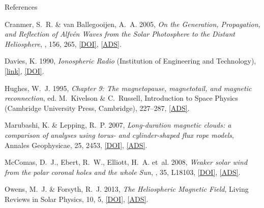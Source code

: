 \documentclass[11pt,aspectratio=1610]{beamer}	%
\begin{document}
\begin{frame}[t,allowframebreaks]{References}
	\tiny
	\begin{thebibliography}{10}
	
		\beamertemplatebookbibitems
		
		\beamertemplatearticlebibitems
		
			{Cranmer}, S.~R. \& {van Ballegooijen}, A.~A. 2005, \emph{{On the Generation,
			Propagation, and Reflection of Alfv{\'e}n Waves from the Solar Photosphere to
			the Distant Heliosphere}}, \apjs, 156, 265,
			\href{http://dx.doi.org/10.1086/426507}{[DOI]},
			\href{http://adsabs.harvard.edu/abs/2005ApJS..156..265C}{[ADS]}.
		
			Davies, K. 1990, \emph{Ionospheric Radio} (Institution of Engineering and
			Technology),
			\href{http://digital-library.theiet.org/content/books/ew/pbew031e}{[link]},
			\href{http://dx.doi.org/10.1049/PBEW031E}{[DOI]}.
		
			{Hughes}, W.~J. 1995, \emph{{Chapter 9: The magnetopause, magnetotail, and
			magnetic reconnection}}, ed. M.~Kivelson \& C.~Russell, Introduction to Space
			Physics (Cambridge University Press, Cambridge), 227--287,
			\href{http://adsabs.harvard.edu/abs/1995isp..book.....K}{[ADS]}.
		
			{Marubashi}, K. \& {Lepping}, R.~P. 2007, \emph{{Long-duration magnetic clouds:
			a comparison of analyses using torus- and cylinder-shaped flux rope models}},
			Annales Geophysicae, 25, 2453,
			\href{http://dx.doi.org/10.5194/angeo-25-2453-2007}{[DOI]},
			\href{http://adsabs.harvard.edu/abs/2007AnGeo..25.2453M}{[ADS]}.
			
			{McComas}, D.~J., {Ebert}, R.~W., {Elliott}, H.~A. {et~al.} 2008{},
			\emph{{Weaker solar wind from the polar coronal holes and the whole Sun}},
			\grl, 35, L18103, \href{http://dx.doi.org/10.1029/2008GL034896}{[DOI]},
			\href{http://adsabs.harvard.edu/abs/2008GeoRL..3518103M}{[ADS]}.
		
			{Owens}, M.~J. \& {Forsyth}, R.~J. 2013, \emph{{The Heliospheric Magnetic
			Field}}, Living Reviews in Solar Physics, 10, 5,
			\href{http://dx.doi.org/10.12942/lrsp-2013-5}{[DOI]},
			\href{http://adsabs.harvard.edu/abs/2013LRSP...10....5O}{[ADS]}.
		

\end{thebibliography}
\end{frame}
\end{document}
